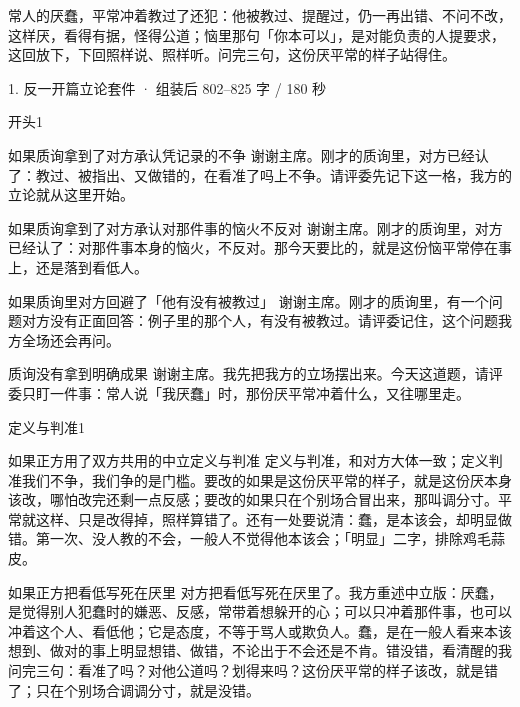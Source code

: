 \documentclass[script,con]{debate}
\begin{document}
\debatetitle
\begin{thesisbox}[全场一句话立论]常人的厌蠢，平常冲着教过了还犯：他被教过、提醒过，仍一再出错、不问不改，这样厌，看得有据，怪得公道；恼里那句「你本可以」，是对能负责的人提要求，这回放下，下回照样说、照样听。问完三句，这份厌平常的样子站得住。\end{thesisbox}

\begin{kit}{1. 反一开篇立论}{套件 · 组装后 802–825 字 / 180 秒}
\begin{pick}{开头}{1}
\begin{module}{如果质询拿到了对方承认凭记录的不争}
谢谢主席。刚才的质询里，对方已经认了：教过、被指出、又做错的，在看准了吗上不争。请评委先记下这一格，我方的立论就从这里开始。
\end{module}
\begin{module}{如果质询拿到了对方承认对那件事的恼火不反对}
谢谢主席。刚才的质询里，对方已经认了：对那件事本身的恼火，不反对。那今天要比的，就是这份恼平常停在事上，还是落到看低人。
\end{module}
\begin{module}{如果质询里对方回避了「他有没有被教过」}
谢谢主席。刚才的质询里，有一个问题对方没有正面回答：例子里的那个人，有没有被教过。请评委记住，这个问题我方全场还会再问。
\end{module}
\begin{fallback}{质询没有拿到明确成果}
谢谢主席。我先把我方的立场摆出来。今天这道题，请评委只盯一件事：常人说「我厌蠢」时，那份厌平常冲着什么，又往哪里走。
\end{fallback}
\end{pick}
\begin{pick}{定义与判准}{1}
\begin{module}{如果正方用了双方共用的中立定义与判准}
定义与判准，和对方大体一致；定义判准我们不争，我们争的是门槛。要改的如果是这份厌平常的样子，就是这份厌本身该改，哪怕改完还剩一点反感；要改的如果只在个别场合冒出来，那叫调分寸。平常就这样、只是改得掉，照样算错了。还有一处要说清：蠢，是本该会，却明显做错。第一次、没人教的不会，一般人不觉得他本该会；「明显」二字，排除鸡毛蒜皮。
\end{module}
\begin{module}{如果正方把看低写死在厌里}
对方把看低写死在厌里了。我方重述中立版：厌蠢，是觉得别人犯蠢时的嫌恶、反感，常带着想躲开的心；可以只冲着那件事，也可以冲着这个人、看低他；它是态度，不等于骂人或欺负人。蠢，是在一般人看来本该想到、做对的事上明显想错、做错，不论出于不会还是不肯。错没错，看清醒的我问完三句：看准了吗？对他公道吗？划得来吗？这份厌平常的样子该改，就是错了；只在个别场合调调分寸，就是没错。

\end{module}
\end{pick}
\end{kit}
\end{document}
